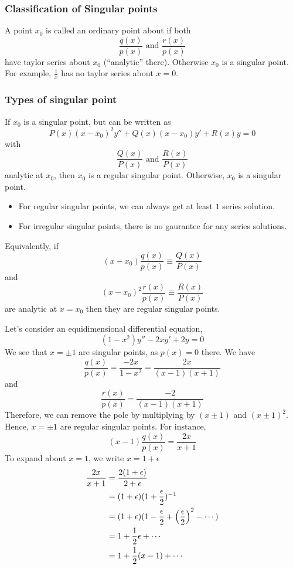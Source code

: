 \documentclass{article}
\begin{document}
\subsubsection{Classification of Singular points}
\begin{defi}
    A point $x_0$ is called an ordinary point about  if both
    \[
        \frac{q(x)}{p(x)} \text{ and } \frac{r(x)}{p(x)}
    \]
    have taylor series about $x_0$ (``analytic'' there).
    Otherwise $x_0$ is a singular point.
    For example, $\frac{1}{x}$ has no taylor series about $x = 0$.
\end{defi}

\subsubsection*{Types of singular point}
If $x_0$ is a singular point, but  can be written as
\[
    P(x)(x - x_0)^2 y'' + Q(x)(x - x_0)y' + R(x)y = 0
\]
with
\[
    \frac{Q(x)}{P(x)} \text{ and } \frac{R(x)}{P(x)}
\]
analytic at $x_0$, then $x_0$ is a regular singular point.
Otherwise, $x_0$ is a singular point.
\begin{itemize}
    \item For regular singular points, we can always get at least $1$ series solution.
    \item For irregular singular points, there is no gaurantee for any series solutions.
\end{itemize}
Equivalently, if 
\[
   (x - x_0) \frac{q(x)}{p(x)} \equiv \frac{Q(x)}{P(x)}
\]
and
\[
    (x - x_0)^2 \frac{r(x)}{p(x)} \equiv \frac{R(x)}{P(x)}
\]
are analytic at $x = x_0$ then they are regular singular points.


\begin{eg}
    Let's consider an equidimensional differential equation,
    \[
        (1 - x^2)y'' -2x y' + 2y = 0  
    \]
    We see that $x = \pm 1$ are singular points, as $p(x) = 0$ there. 
    We have
    \[
        \frac{q(x)}{p(x)} = \frac{-2x}{1 - x^2} = \frac{2x}{(x - 1)(x + 1)}  
    \]
    and
    \[
        \frac{r(x)}{p(x)} = \frac{-2}{(x - 1)(x + 1)}
    \]
    Therefore, we can remove the pole by multiplying by $(x \pm 1)$ and $(x \pm 1)^2$.
    Hence, $x = \pm 1$ are regular singular points. For instance,
    \[
        (x - 1) \frac{q(x)}{p(x)} = \frac{2x}{x + 1}
    \]
    To expand about $x = 1$, we write $x = 1 + \epsilon$
    \begin{align*}
        \frac{2x}{x + 1} &= \frac{2(1 + \epsilon)}{2 + \epsilon} \\
        &= (1 + \epsilon)(1 + \frac{\epsilon}{2})^{-1} \\
        &= (1 + \epsilon)(1 - \frac{\epsilon}{2} + \left( \frac{\epsilon}{2} \right)^2 - \cdots) \\
        &= 1 + \frac{1}{2} \epsilon + \cdots \\
        &= 1 + \frac{1}{2} (x - 1) + \cdots
    \end{align*}
\end{eg}
\end{document}
